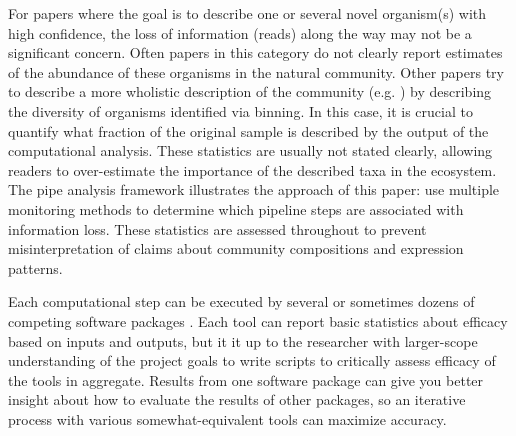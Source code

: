 For papers where the goal is to describe one or several novel organism(s) with high confidence, the loss of information (reads) along the way may not be a significant concern.
Often papers in this category do not clearly report estimates of the abundance of these organisms in the natural community.
Other papers try to describe a more wholistic description of the community (e.g. \cite{kantor2017}) by describing the diversity of organisms identified via binning.
In this case, it is crucial to quantify what fraction of the original sample is described by the output of the computational analysis.
These statistics are usually not stated clearly, allowing readers to over-estimate the importance of the described taxa in the ecosystem.
The pipe analysis framework illustrates the approach of this paper: use multiple monitoring methods to determine which pipeline steps are associated with information loss.
These statistics are assessed throughout to prevent misinterpretation of claims about community compositions and expression patterns.

Each computational step can be executed by several or sometimes dozens of competing software packages \cite{sangwan2016,thomas2012}.
Each tool can report basic statistics about efficacy based on inputs and outputs, but it it up to the researcher with larger-scope understanding of the project goals to write scripts to critically assess efficacy of the tools in aggregate.
Results from one software package can give you better insight about how to evaluate the results of other packages, so an iterative process with various somewhat-equivalent tools can maximize accuracy.

